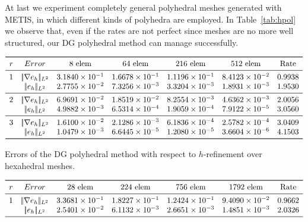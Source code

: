 \documentclass[12pt, a4paper]{article}
\theoremstyle{definition}
\theoremstyle{plain}
\theoremstyle{plain}
\begin{document}
At last we experiment completely general polyhedral meshes generated with METIS, in which different kinds of polyhedra are employed. In Table~\ref{tab:hpol} we observe that, even if the rates are not perfect since meshes are no more well structured, our DG polyhedral method can manage successfully.
\begin{table}[h!]\footnotesize
	\centering
	\[
	\begin{array}{ccccccc}
	\toprule
	r & Error & \text{8 elem} & \text{64 elem} & \text{216 elem} & 
	\text{512 elem} & \text{Rate} \\ 
	\midrule
	1 & |\!|\nabla e_{h}|\!|_{L^2} & 3.1840 \times 10^{-1} & 1.6678 \times 
	10^{-1} & 1.1196 \times 10^{-1} & 8.4123 \times 10^{-2} & 0.9938\\
	& |\!|e_{h}|\!|_{L^2} & 2.7755 \times 10^{-2} & 7.3256 \times 10^{-3} & 3.3204 \times 10^{-3} & 
	1.8931 \times 10^{-3} & 1.9530\\
	\midrule
	2 & |\!|\nabla e_{h}|\!|_{L^2} & 6.9691 \times 10^{-2} & 1.8519 \times 
	10^{-2} & 8.2554 \times 10^{-3} & 4.6362 \times 10^{-3} & 2.0056\\
	& |\!|e_{h}|\!|_{L^2} & 4.9882 \times 10^{-3} & 6.5314 \times 10^{-4} & 1.9059 \times 10^{-4} & 
	7.9122 \times 10^{-5} & 3.0560\\
	\midrule
	3 & |\!|\nabla e_{h}|\!|_{L^2} & 1.6100 \times 10^{-2} & 2.1286 \times 
	10^{-3} & 6.1836 \times 10^{-4} & 2.5782 \times 10^{-4} & 3.0409\\
	& |\!|e_{h}|\!|_{L^2} & 1.0479 \times 10^{-3} & 6.6445 \times 10^{-5} & 1.2080 \times 10^{-5} & 
	3.6604 \times 10^{-6} & 4.1503\\
	\bottomrule
	\end{array}
	\]
	\caption{Errors of the DG polyhedral method with respect to $h$-refinement over hexahedral meshes.} \label{tab:hhex}
	\[
	\begin{array}{ccccccc}
	\toprule
	r & Error & \text{28 elem} & \text{224 elem} & \text{756 elem} & 
	\text{1792 elem} & \text{Rate} \\ 
	\midrule
	1 & |\!|\nabla e_{h}|\!|_{L^2} & 3.3681 \times 10^{-1} & 1.8227 \times 
	10^{-1} & 1.2424 \times 10^{-1} & 9.4090 \times 10^{-2} & 0.9662\\
	& |\!|e_{h}|\!|_{L^2} & 2.5401 \times 10^{-2} & 6.1132 \times 10^{-3} & 2.6651 \times 10^{-3} & 
	1.4851 \times 10^{-3} & 2.0326\\
	\midrule

\end{array}\]
\end{table}
\end{document}

